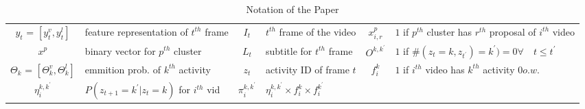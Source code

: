 \setlength{\tabcolsep}{1mm}
\begin{table*}
\footnotesize
\centering
\caption{Notation of the Paper}
\begin{tabular}{|cp{4cm}|cp{3cm}|cp{5cm}|}
  \hline
$y_t$ = $\left[y_t^v,y_t^l\right]$ & feature representation of $t^{th}$ frame & $I_t$ & $t^{th}$ frame of the video & $x^p_{i,r}$ & $1$ if $p^{th}$ cluster has $r^{th}$ proposal of $i^{th}$ video  \\
$x^p$ & binary vector for $p^{th}$ cluster & $L_t$ & subtitle for $t^{th}$ frame & $O^{k,k^\prime}$ & $1$ if $\#(z_t=k,z_{t^\prime})=k^\prime) = 0 \forall\quad t \leq t^\prime$ \\
$\Theta_k$ = $\left[\Theta_k^v,\Theta_k^l\right]$ & emmition prob. of $k^{th}$ activity & $z_t$ & activity ID of frame  $t$ & $f_i^k$ & $1$ if $i^{th}$ video has $k^{th}$ activity $0 o.w.$ \\
$\eta_i^{k,k^\prime}$ & $P(z_{t+1}=k^\prime|z_{t}=k)$ for $i^{th}$ vid & $\pi_i^{k,k^\prime}$ & $\eta_i^{k,k^\prime} \times f_i^k \times f_i^{k^\prime}$
& & \\ \hline
\end{tabular}
\end{table*}
\normalsize
